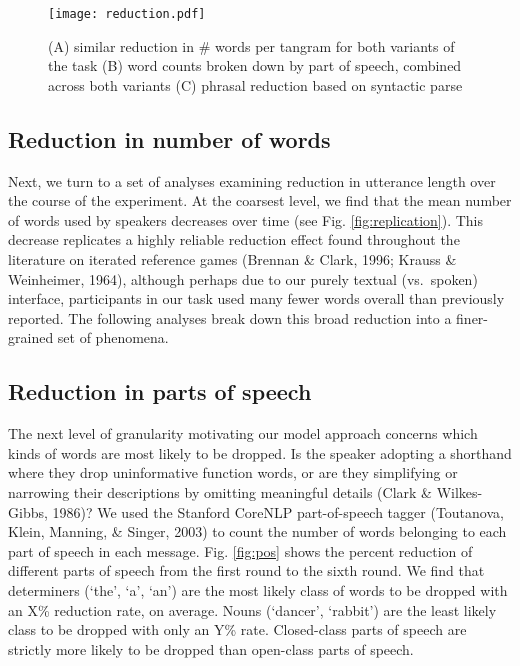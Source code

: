 \begin{figure}[t]
\texttt{[image: reduction.pdf]}
\caption{(A) similar reduction in \# words per tangram for both variants of the task (B) word counts broken down by part of speech, combined across both variants (C) phrasal reduction based on syntactic parse }
\label{fig:reduction}
\end{figure}

\subsection{Reduction in number of words}\label{reduction}

Next, we turn to a set of analyses examining reduction in utterance length over the course of the experiment. 
At the coarsest level, we find that the mean number of words used by speakers decreases over time (see Fig. \ref{fig:replication}). 
This decrease replicates a highly reliable reduction effect found throughout the literature on iterated reference games (Brennan \& Clark, 1996; Krauss \& Weinheimer, 1964), although perhaps due to our purely textual (vs.~spoken) interface, participants in our task used many fewer words overall than previously reported. 
The following analyses break down this broad reduction into a finer-grained set of phenomena.

\subsection{Reduction in parts of speech}
The next level of granularity motivating our model approach concerns which kinds of words are most likely to be dropped. 
Is the speaker adopting a shorthand where they drop uninformative function words, or are they simplifying or narrowing their descriptions by omitting meaningful details (Clark \& Wilkes-Gibbs, 1986)? 
We used the Stanford CoreNLP part-of-speech tagger (Toutanova, Klein, Manning, \& Singer, 2003) to count the number of words belonging to each part of speech in each message. Fig. \ref{fig:pos} shows the percent reduction of different parts of speech from the first round to the sixth round. 
We find that determiners (`the', `a', `an') are the most likely class of words to be dropped with an X\% reduction rate, on average. 
Nouns (`dancer', `rabbit') are the least likely class to be dropped with only an Y\% rate. 
Closed-class parts of speech are strictly more likely to be dropped than open-class parts of speech.

